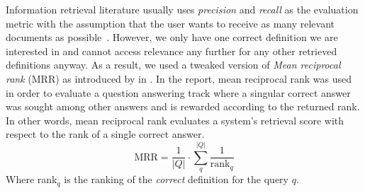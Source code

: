Information retrieval literature usually uses \emph{precision} and \emph{recall} as the evaluation metric with the assumption that the user wants to receive as many relevant documents as possible~\cite{salton_state_1992}.
However, we only have one correct definition we are interested in and cannot access relevance any further for any other retrieved definitions anyway.
As a result, we used a tweaked version of \emph{Mean reciprocal rank} (MRR) as introduced by \textcite{voorhees_trec-8_1999} in .
In the report, mean reciprocal rank was used in order to evaluate a question answering track where a singular correct answer was sought among other answers and is rewarded according to the returned rank.
In other words, mean reciprocal rank evaluates a system's retrieval score with respect to the rank of a single correct answer. %
\begin{equation}
    \text{MRR} = \frac{1}{|Q|} \cdot \sum_{q}^{|Q|} \frac{1}{\text{rank}_{q}}
\end{equation}
Where rank$_q$ is the ranking of the \emph{correct} definition for the query $q$.

